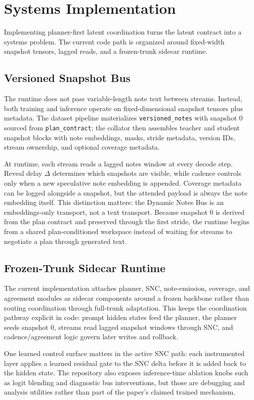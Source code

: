 \section{Systems Implementation}
\label{sec:systems}

Implementing planner-first latent coordination turns the latent contract into a systems problem. The current code path is organized around fixed-width snapshot tensors, lagged reads, and a frozen-trunk sidecar runtime.

\subsection{Versioned Snapshot Bus}
The runtime does not pass variable-length note text between streams. Instead, both training and inference operate on fixed-dimensional snapshot tensors plus metadata. The dataset pipeline materializes \texttt{versioned\_notes} with snapshot 0 sourced from \texttt{plan\_contract}; the collator then assembles teacher and student snapshot blocks with note embeddings, masks, stride metadata, version IDs, stream ownership, and optional coverage metadata.

At runtime, each stream reads a lagged notes window at every decode step. Reveal delay $\Delta$ determines which snapshots are visible, while cadence controls only when a new speculative note embedding is appended. Coverage metadata can be logged alongside a snapshot, but the attended payload is always the note embedding itself. This distinction matters: the Dynamic Notes Bus is an embeddings-only transport, not a text transport.
Because snapshot 0 is derived from the plan contract and preserved through the first stride, the runtime begins from a shared plan-conditioned workspace instead of waiting for streams to negotiate a plan through generated text.

\subsection{Frozen-Trunk Sidecar Runtime}
The current implementation attaches planner, SNC, note-emission, coverage, and agreement modules as sidecar components around a frozen backbone rather than routing coordination through full-trunk adaptation. This keeps the coordination pathway explicit in code: prompt hidden states feed the planner, the planner seeds snapshot 0, streams read lagged snapshot windows through SNC, and cadence/agreement logic govern later writes and rollback.

One learned control surface matters in the active SNC path: each instrumented layer applies a learned residual gate to the SNC delta before it is added back to the hidden state. The repository also exposes inference-time ablation knobs such as logit blending and diagnostic bus interventions, but those are debugging and analysis utilities rather than part of the paper's claimed trained mechanism.
